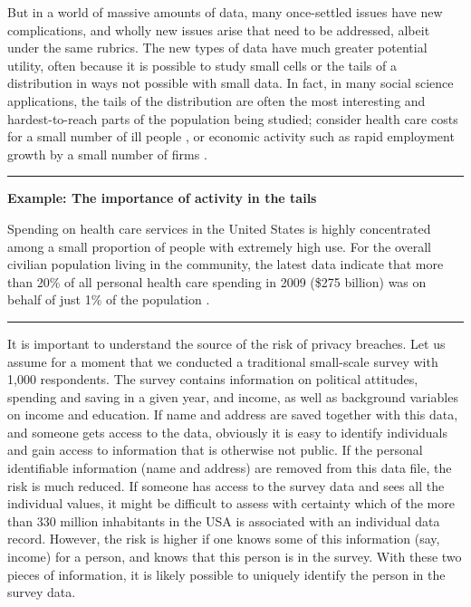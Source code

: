 \documentclass[]{krantz}
\begin{document}
But in a world of massive amounts of data, many once-settled issues have
new complications, and wholly new issues arise that need to be
addressed, albeit under the same rubrics. The new types of data have
much greater potential utility, often because it is possible to study
small cells or the tails of a distribution in ways not possible with
small data. In fact, in many social science applications, the tails of
the distribution are often the most interesting and hardest-to-reach
parts of the population being studied; consider health care costs for a
small number of ill people \citep{stanton2006high}, or economic activity
such as rapid employment growth by a small number of firms
\citep{decker2015has}.

\begin{center}\rule{0.5\linewidth}{\linethickness}\end{center}

\textbf{Example: The importance of activity in the tails}

Spending on health care services in the United States is highly
concentrated among a small proportion of people with extremely high use.
For the overall civilian population living in the community, the latest
data indicate that more than 20\% of all personal health care spending
in 2009 (\$275 billion) was on behalf of just 1\% of the population
\citep{healthcarespending}.

\begin{center}\rule{0.5\linewidth}{\linethickness}\end{center}

It is important to understand the source of the risk of privacy
breaches. Let us assume for a moment that we conducted a traditional
small-scale survey with 1,000 respondents. The survey contains
information on political attitudes, spending and saving in a given year,
and income, as well as background variables on income and education. If
name and address are saved together with this data, and someone gets
access to the data, obviously it is easy to identify individuals and
gain access to information that is otherwise not public. If the personal
identifiable information (name and address) are removed from this data
file, the risk is much reduced. If someone has access to the survey data
and sees all the individual values, it might be difficult to assess with
certainty which of the more than 330 million inhabitants in the USA is
associated with an individual data record. However, the risk is higher
if one knows some of this information (say, income) for a person, and
knows that this person is in the survey. With these two pieces of
information, it is likely possible to uniquely identify the person in
the survey data.
\end{document}
